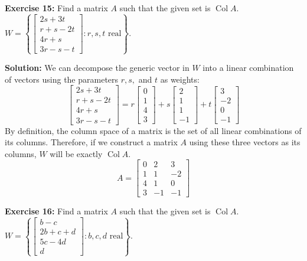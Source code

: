 \documentclass[11pt]{article}
\begin{document}
\textbf{Exercise 15:} Find a matrix $A$ such that the given set is $\operatorname{Col} A$. 
$W = \left\{ \begin{bmatrix} 2s+3t \\ r+s-2t \\ 4r+s \\ 3r-s-t \end{bmatrix} : r, s, t \text{ real} \right\}$.

\textbf{Solution:}
We can decompose the generic vector in $W$ into a linear combination of vectors using the parameters $r, s,$ and $t$ as weights:
\[
\begin{bmatrix} 2s+3t \\ r+s-2t \\ 4r+s \\ 3r-s-t \end{bmatrix} = r \begin{bmatrix} 0 \\ 1 \\ 4 \\ 3 \end{bmatrix} + s \begin{bmatrix} 2 \\ 1 \\ 1 \\ -1 \end{bmatrix} + t \begin{bmatrix} 3 \\ -2 \\ 0 \\ -1 \end{bmatrix}
\]
By definition, the column space of a matrix is the set of all linear combinations of its columns. Therefore, if we construct a matrix $A$ using these three vectors as its columns, $W$ will be exactly $\operatorname{Col} A$.
\[
A = \begin{bmatrix} 0 & 2 & 3 \\ 1 & 1 & -2 \\ 4 & 1 & 0 \\ 3 & -1 & -1 \end{bmatrix}
\]

\vspace{0.5cm}

\textbf{Exercise 16:} Find a matrix $A$ such that the given set is $\operatorname{Col} A$.
$W = \left\{ \begin{bmatrix} b-c \\ 2b+c+d \\ 5c-4d \\ d \end{bmatrix} : b, c, d \text{ real} \right\}$.
\end{document}
